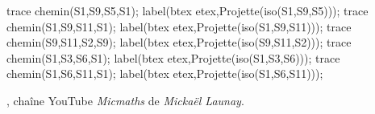 \begin{changemargin}{-10mm}{-15mm}
\begin{debat}
\begin{center}
{\begin{Geometrie}[CoinBG={u*(-10,-10)},TypeTrace="Espace"]
         trace chemin(S1,S9,S5,S1);
         label(btex \Large{} etex,Projette(iso(S1,S9,S5)));
         trace chemin(S1,S9,S11,S1);
         label(btex \Large{} etex,Projette(iso(S1,S9,S11)));
         trace chemin(S9,S11,S2,S9);
         label(btex \Large{} etex,Projette(iso(S9,S11,S2)));
         trace chemin(S1,S3,S6,S1);
         label(btex \Large{} etex,Projette(iso(S1,S3,S6)));
         trace chemin(S1,S6,S11,S1);
         label(btex \Large{} etex,Projette(iso(S1,S6,S11)));
      \end{Geometrie}
      }
   \end{center}
   \begin{cadre}[B2][J4]
      \begin{center}
         , chaîne YouTube {\it Micmaths} de {\it Mickaël Launay}.
      \end{center}
   \end{cadre}
 \end{debat}
\end{changemargin}
 